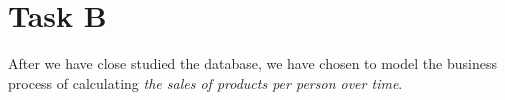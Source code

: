 \section{Task B}
After we have close studied the database, we have chosen to model the business process of calculating \textit{the sales of products per person over time}. 
